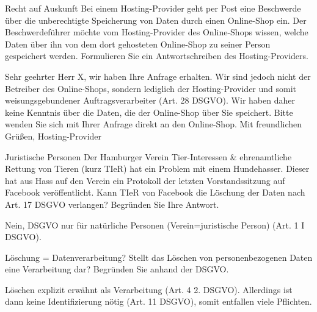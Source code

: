 \documentclass{article}
\begin{document}
\begin{exercise}{Recht auf Auskunft}
  Bei einem Hosting-Provider geht per Post eine Beschwerde über die unberechtigte Speicherung von Daten durch einen Online-Shop ein. Der Beschwerdeführer möchte vom Hosting-Provider des Online-Shops wissen, welche Daten über ihn von dem dort gehosteten Online-Shop zu seiner Person gespeichert werden.\newline
  Formulieren Sie ein Antwortschreiben des Hosting-Providers.

  \begin{solution}
    Sehr geehrter Herr X,\newline
    wir haben Ihre Anfrage erhalten. Wir sind jedoch nicht der Betreiber des Online-Shops, sondern lediglich der Hosting-Provider und somit weisungsgebundener Auftragsverarbeiter (Art. 28 DSGVO). Wir haben daher keine Kenntnis über die Daten, die der Online-Shop über Sie speichert. Bitte wenden Sie sich mit Ihrer Anfrage direkt an den Online-Shop.\newline
    Mit freundlichen Grüßen,\newline
    Hosting-Provider
  \end{solution}
\end{exercise}

\begin{exercise}{Juristische Personen}
  Der Hamburger Verein Tier-Interessen \& ehrenamtliche Rettung von Tieren (kurz TIeR) hat ein Problem mit einem Hundehasser. Dieser hat aus Hass auf den Verein ein Protokoll der letzten Vorstandssitzung auf Facebook veröffentlicht. Kann TIeR von Facebook die Löschung der Daten nach Art. 17 DSGVO verlangen? Begründen Sie Ihre Antwort.

  \begin{solution}
    Nein, DSGVO nur für natürliche Personen (Verein=juristische Person) (Art. 1 I DSGVO).
  \end{solution}
\end{exercise}

\begin{exercise}{Löschung = Datenverarbeitung?}
  Stellt das Löschen von personenbezogenen Daten eine Verarbeitung dar? Begründen Sie anhand der DSGVO.

  \begin{solution}
    Löschen explizit erwähnt als Verarbeitung (Art. 4 2. DSGVO). Allerdings ist dann keine Identifizierung nötig (Art. 11 DSGVO), somit entfallen viele Pflichten.
  \end{solution}
\end{exercise}
\end{document}
